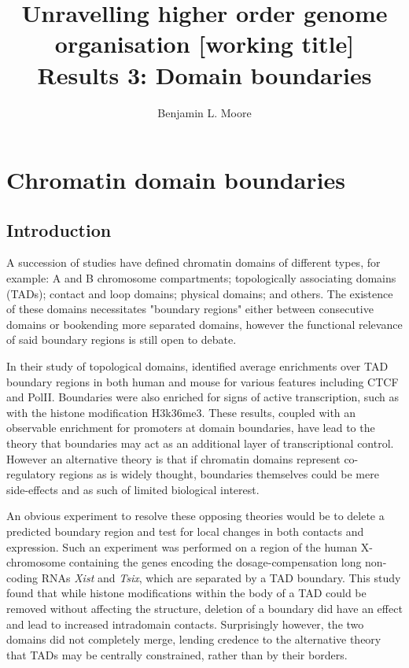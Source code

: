 \documentclass[a4paper,11pt,oneside]{book}
\title{ \vspace{3in} Unravelling higher order genome organisation {\small [working
    title]} \\ \vspace{2em} {\large {\bf Results 3: Domain boundaries}} }
\author{Benjamin L. Moore}
\begin{document}

\chapter{Chromatin domain boundaries}\label{chap:boundaries}

\section{Introduction}

A succession of studies have defined chromatin domains of different types, for example: A and B chromosome compartments;\cite{Lieberman2009} topologically associating domains (TADs);\cite{Dixon2012} contact and loop domains;\cite{Rao2014} physical domains;\cite{Sexton2012, Hou2012} and others.\cite{Filippova2014} The existence of these domains necessitates "boundary regions" either between consecutive domains or bookending more separated domains, however the functional relevance of said boundary regions is still open to debate.

In their study of topological domains, \citet{Dixon2012} identified average enrichments over TAD boundary regions in both human and mouse for various features including CTCF and PolII. Boundaries were also enriched for signs of active transcription, such as with the histone modification H3k36me3.\cite{Dixon2012} These results, coupled with an observable enrichment for promoters at domain boundaries, have lead to the theory that boundaries may act as an additional layer of transcriptional control.\cite{Sexton2015} However an alternative theory  is that if chromatin domains represent co-regulatory regions as is widely thought,\cite{LeDily2014, Nora2013, Sexton2015} boundaries themselves could be mere side-effects and as such of limited biological interest.

An obvious experiment to resolve these opposing theories would be to delete a predicted boundary region and test for local changes in both contacts and expression. Such an experiment was performed on a region of the human X-chromosome containing the genes encoding the dosage-compensation long non-coding RNAs \emph{Xist} and \emph{Tsix}, which are separated by a TAD boundary.\cite{Nora2012} This study found that while histone modifications within the body of a TAD could be removed without affecting the structure, deletion of a boundary did have an effect and lead to increased intradomain contacts.\cite{Nora2012} Surprisingly however, the two domains did not completely merge, lending credence to the alternative theory that TADs may be centrally constrained, rather than by their borders.\cite{Nora2012} 
\end{document}
